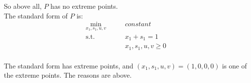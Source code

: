 \documentclass[10pt]{article}
\begin{document}
So above all, $P$ has no extreme points.\\
The standard form of $P$ is:\\
\begin{equation}
	\begin{aligned}
		\min_{x_1,s_1,u,v}\qquad & constant \\ 
		\mathrm{s.t.}\qquad & x_1+s_1=1 \\
							& x_1,s_1,u,v\geq 0 \\
	\end{aligned}
\end{equation}

The standard form has extreme points, and $(x_1,s_1,u,v)=(1,0,0,0)$ is one of the extreme points. The reasons are above.\\
\end{document}

